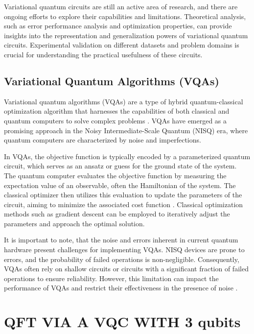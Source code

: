 \documentclass[inscr,ack,preface]{diphdthesis}
\begin{document}
Variational quantum circuits are still an active area of research, and there are ongoing efforts to explore their capabilities and limitations. Theoretical analysis, such as error performance analysis and optimization properties, can provide insights into the representation and generalization powers of variational quantum circuits. Experimental validation on different datasets and problem domains is crucial for understanding the practical usefulness of these circuits.

\section{Variational Quantum Algorithms (VQAs)}

Variational quantum algorithms (VQAs) are a type of hybrid quantum-classical optimization algorithm that harnesses the capabilities of both classical and quantum computers to solve complex problems \cite{vqa}. VQAs have emerged as a promising approach in the Noisy Intermediate-Scale Quantum (NISQ) era, where quantum computers are characterized by noise and imperfections.

In VQAs, the objective function is typically encoded by a parameterized quantum circuit, which serves as an ansatz or guess for the ground state of the system. The quantum computer evaluates the objective function by measuring the expectation value of an observable, often the Hamiltonian of the system. The classical optimizer then utilizes this evaluation to update the parameters of the circuit, aiming to minimize the associated cost function \cite{vqa}. Classical optimization methods such as gradient descent can be employed to iteratively adjust the parameters and approach the optimal solution.

It is important to note, that the noise and errors inherent in current quantum hardware present challenges for implementing VQAs. NISQ devices are prone to errors, and the probability of failed operations is non-negligible. Consequently, VQAs often rely on shallow circuits or circuits with a significant fraction of failed operations to ensure reliability. However, this limitation can impact the performance of VQAs and restrict their effectiveness in the presence of noise \cite{limitations}.

\chapter{ QFT VIA A  VQC WITH 3 qubits}
\end{document}
